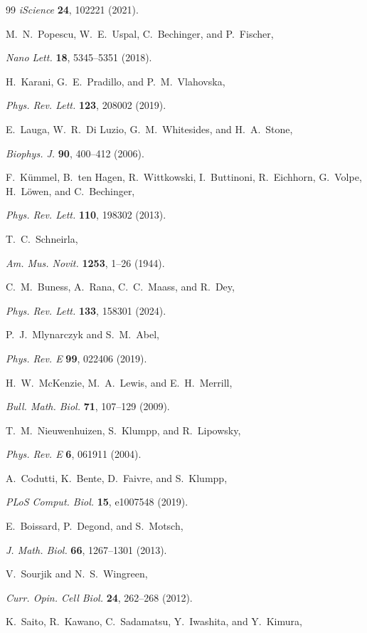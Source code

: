 \documentclass[
 reprint,










 amsmath,amssymb,
 aps, prl,






longbibliography
]{revtex4-2}
\begin{document}
\begin{thebibliography}{99}
\emph{iScience} \textbf{24}, 102221 (2021).

M.~N.~Popescu, W.~E.~Uspal, C.~Bechinger, and P.~Fischer,

 \emph{Nano Lett.} \textbf{18}, 5345--5351 (2018).

H.~Karani, G.~E.~Pradillo, and P.~M.~Vlahovska,

\emph{Phys. Rev. Lett.} \textbf{123}, 208002 (2019).

E.~Lauga, W.~R.~Di Luzio, G.~M.~Whitesides, and H.~A.~Stone,

\emph{Biophys. J.} \textbf{90}, 400--412 (2006).

F.~Kümmel, B.~ten Hagen, R.~Wittkowski, I.~Buttinoni, R.~Eichhorn, G.~Volpe, H.~Löwen, and C.~Bechinger,

 \emph{Phys. Rev. Lett.} \textbf{110}, 198302 (2013).

T.~C.~Schneirla,

\emph{Am. Mus. Novit.} \textbf{1253}, 1--26 (1944).

C.~M.~Buness, A.~Rana, C.~C.~Maass, and R.~Dey,

 \emph{Phys. Rev. Lett.} \textbf{133}, 158301 (2024).

P.~J.~Mlynarczyk and S.~M.~Abel,

\emph{Phys. Rev. E} \textbf{99}, 022406 (2019).

H.~W.~McKenzie, M.~A.~Lewis, and E.~H.~Merrill,

\emph{Bull. Math. Biol.} \textbf{71}, 107--129 (2009).

T.~M.~Nieuwenhuizen, S.~Klumpp, and R.~Lipowsky,

\emph{Phys. Rev. E} \textbf{6}, 061911 (2004).

A.~Codutti, K.~Bente, D.~Faivre, and S.~Klumpp,

 \emph{PLoS Comput. Biol.} \textbf{15}, e1007548 (2019).

E.~Boissard, P.~Degond, and S.~Motsch,

\emph{J. Math. Biol.} \textbf{66}, 1267--1301 (2013).

V.~Sourjik and N.~S.~Wingreen,

 \emph{Curr. Opin. Cell Biol.} \textbf{24}, 262--268 (2012).

K.~Saito, R.~Kawano, C.~Sadamatsu, Y.~Iwashita, and Y.~Kimura,


\end{thebibliography}
\end{document}

